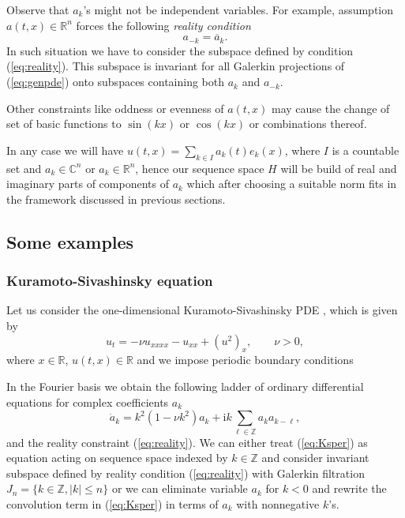 Observe that $a_k$'s might not be independent variables. For example, assumption $a(t,x) \in \mathbb{R}^n$ forces the following \emph{reality condition}
\begin{equation}
  a_{-k}=\overline{a}_{k}.  \label{eq:reality}
\end{equation}
In such situation we have to consider the subspace defined by condition (\ref{eq:reality}). This subspace is invariant for all Galerkin projections of (\ref{eq:genpde}) onto subspaces containing both $a_k$ and $a_{-k}$. 

Other constraints like oddness or evenness of $a(t,x)$ may cause the
change of set of basic functions to $\sin(kx)$ or $\cos(kx)$ or combinations thereof.

In any case we will have $u(t,x)=\sum_{k \in I} a_k(t) e_k(x)$, where $I$ is a countable set and $a_k \in \mathbb{C}^n$ or $a_k \in \mathbb{R}^n$, hence our sequence space $H$ will be build
of real and imaginary parts of components of $a_k$ which  after choosing a suitable norm fits in the framework discussed in previous sections.  



\subsection{Some examples}


\subsubsection{Kuramoto-Sivashinsky equation}
Let us consider the one-dimensional Kuramoto-Sivashinsky PDE \cite{KT,S}, which is given by
\begin{equation}\label{eq:KS}
u_t = -\nu u_{xxxx} - u_{xx} + (u^2)_x, \qquad \nu>0,
\end{equation}
where $x \in \mathbb{R}$, $u(t,x) \in \mathbb{R}$ and we impose periodic boundary conditions

In the Fourier basis we obtain  the following ladder of ordinary differential equations for complex coefficients $a_k$
\begin{equation}
  \dot{a}_k = k^2(1-\nu k^2) a_k + \mathrm{i}k \sum_{\ell \in \mathbb{Z}} a_k a_{k - \ell},  \label{eq:Ksper}
\end{equation}
and the reality constraint (\ref{eq:reality}). We can either treat (\ref{eq:Ksper}) as equation acting on sequence space indexed 
by $k \in \mathbb{Z}$ and consider invariant subspace defined by reality condition (\ref{eq:reality}) with Galerkin filtration $J_n=\{ k \in \mathbb{Z}, |k| \leq n \}$
or we can eliminate variable $a_k$ for $k<0$ and rewrite the convolution term in (\ref{eq:Ksper}) in terms of $a_k$ with nonnegative $k$'s.

